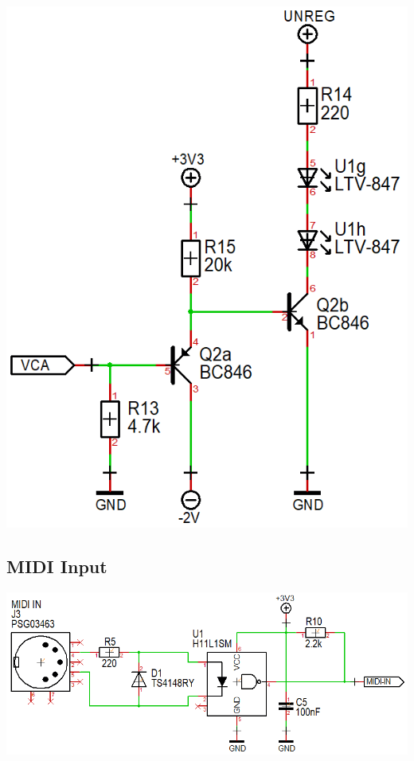 \documentclass{scrartcl}
\begin{document}
\begin{center}
    \includegraphics[scale=0.40]{assets/schema-expo-vca.png}
\end{center}

\subsection{MIDI Input}

\begin{center}
    \includegraphics[scale=0.50]{assets/schema-midi.png}
\end{center}
\end{document}
